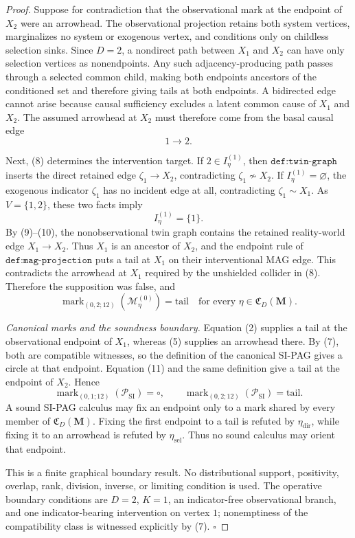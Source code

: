 \documentclass{article}
\begin{document}
\begin{proof}
Suppose for contradiction that the observational mark at the endpoint of \(X_2\)
were an arrowhead.  The observational projection retains both system vertices,
marginalizes no system or exogenous vertex, and conditions only on childless selection
sinks.  Since \(D=2\), a nondirect path between \(X_1\) and \(X_2\) can have only
selection vertices as nonendpoints.  Any such adjacency-producing path passes through
a selected common child, making both endpoints ancestors of the conditioned set and
therefore giving tails at both endpoints.  A bidirected edge cannot arise because causal
sufficiency excludes a latent common cause of \(X_1\) and \(X_2\).  The assumed
arrowhead at \(X_2\) must therefore come from the basal causal edge
\[
 1\longrightarrow2.
 \tag{9}
\]

Next, (8) determines the intervention target.  If
\(2\in I_\eta^{(1)}\), then \(\texttt{def:twin-graph}\) inserts the direct retained
edge \(\zeta_1\to X_2\), contradicting \(\zeta_1\not\sim X_2\).  If
\(I_\eta^{(1)}=\varnothing\), the exogenous indicator \(\zeta_1\) has no incident
edge at all, contradicting \(\zeta_1\sim X_1\).  As \(V=\{1,2\}\), these two
facts imply
\[
 I_\eta^{(1)}=\{1\}.
 \tag{10}
\]
By (9)--(10), the nonobservational twin graph contains the retained reality-world
edge \(X_1\to X_2\).  Thus \(X_1\) is an ancestor of \(X_2\), and the endpoint
rule of \(\texttt{def:mag-projection}\) puts a tail at \(X_1\) on their
interventional MAG edge.  This contradicts the arrowhead at \(X_1\) required by the
unshielded collider in (8).  Therefore the supposition was false, and
\[
 \operatorname{mark}_{(0,2;12)}(\mathcal M_\eta^{(0)})
 =\mathrm{tail}
 \quad\text{for every }\eta\in\mathfrak C_D(\mathbf M).
 \tag{11}
\]

\emph{Canonical marks and the soundness boundary.}
Equation (2) supplies a tail at the observational endpoint of \(X_1\), whereas
(5) supplies an arrowhead there.  By (7), both are compatible witnesses, so the
definition of the canonical SI-PAG gives a circle at that endpoint.  Equation (11)
and the same definition give a tail at the endpoint of \(X_2\).  Hence
\[
 \operatorname{mark}_{(0,1;12)}(\mathcal P_{\mathrm{SI}})=\circ,
 \qquad
 \operatorname{mark}_{(0,2;12)}(\mathcal P_{\mathrm{SI}})=\mathrm{tail}.
 \tag{12}
\]
A sound SI-PAG calculus may fix an endpoint only to a mark shared by every member
of \(\mathfrak C_D(\mathbf M)\).  Fixing the first endpoint to a tail is refuted by
\(\eta_{\mathrm{dir}}\), while fixing it to an arrowhead is refuted by
\(\eta_{\mathrm{sel}}\).  Thus no sound calculus may orient that endpoint.

This is a finite graphical boundary result.  No distributional support, positivity,
overlap, rank, division, inverse, or limiting condition is used.  The operative boundary
conditions are \(D=2\), \(K=1\), an indicator-free observational branch, and one
indicator-bearing intervention on vertex \(1\); nonemptiness of the compatibility class
is witnessed explicitly by (7).  \(\square\)
\end{proof}
\end{document}

